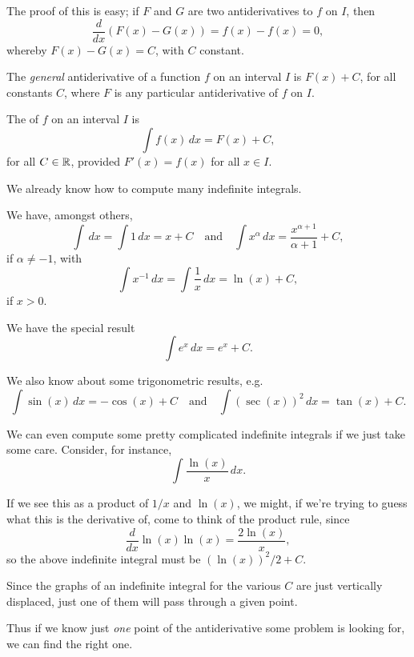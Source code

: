 The proof of this is easy; if $F$ and $G$ are two antiderivatives to $f$ on $I$, then
\[
	\frac{d}{d x} (F(x) - G(x)) = f(x) - f(x) = 0,
\]
whereby $F(x) - G(x) = C$, with $C$ constant.


The \emph{general} antiderivative of a function $f$ on an interval $I$ is $F(x) + C$, for all constants $C$, where $F$ is any particular antiderivative of $f$ on $I$.

\begin{definition}
	The  of $f$ on an interval $I$ is
	\[
		\int f(x) \, d x = F(x) + C,
	\]
	for all $C \in \mathbb{R}$, provided $F'(x) = f(x)$ for all $x \in I$.
\end{definition}

\noindent
We already know how to compute many indefinite integrals.

\begin{examples}
	We have, amongst others,
	\[
		\int \, d x = \int 1 \, d x = x + C \quad \text{and} \quad \int x^\alpha \, d x = \frac{x^{\alpha + 1}}{\alpha + 1} + C,
	\]
	if $\alpha \neq -1$, with
	\[
		\int x^{-1} \, d x = \int \frac{1}{x} \, d x = \ln(x) + C,
	\]
	if $x > 0$.

	We have the special result
	\[
		\int e^x \, d x = e^x + C.
	\]

	\noindent
	We also know about some trigonometric results, e.g.
	\[
		\int \sin(x) \, d x = - \cos(x) + C \quad \text{and} \quad \int (\sec(x))^2 \, d x = \tan(x) + C.
	\]

	\noindent
	We can even compute some pretty complicated indefinite integrals if we just take some care.
	Consider, for instance,
	\[
		\int \frac{\ln(x)}{x} \, d x.
	\]

	\noindent
	If we see this as a product of $1/x$ and $\ln(x)$, we might, if we're trying to guess what this is the derivative of, come to think of the product rule, since
	\[
		\frac{d}{d x} \ln(x) \ln(x) = \frac{2 \ln(x)}{x},
	\]
	so the above indefinite integral must be $(\ln(x))^2 / 2 + C$.
\end{examples}

\noindent
Since the graphs of an indefinite integral for the various $C$ are just vertically displaced, just one of them will pass through a given point.

Thus if we know just \emph{one} point of the antiderivative some problem is looking for, we can find the right one.

